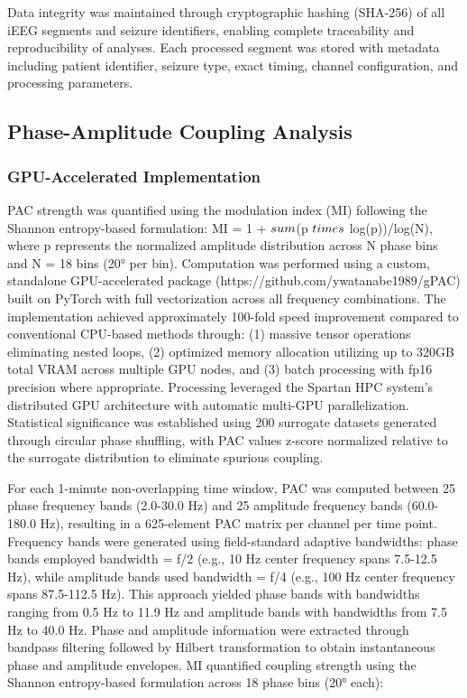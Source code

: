 	Data integrity was maintained through cryptographic hashing (SHA-256) of all iEEG segments and seizure identifiers, enabling complete traceability and reproducibility of analyses. Each processed segment was stored with metadata including patient identifier, seizure type, exact timing, channel configuration, and processing parameters.

\subsection{Phase-Amplitude Coupling Analysis}
\subsubsection{GPU-Accelerated Implementation}
PAC strength was quantified using the modulation index (MI) \cite{Tort} following the Shannon entropy-based formulation: MI = 1 + $\\sum$(p $\\times$ log(p))/log(N), where p represents the normalized amplitude distribution across N phase bins and N = 18 bins (20° per bin). Computation was performed using a custom, standalone GPU-accelerated package (https://github.com/ywatanabe1989/gPAC) built on PyTorch with full vectorization across all frequency combinations. The implementation achieved approximately 100-fold speed improvement compared to conventional CPU-based methods through: (1) massive tensor operations eliminating nested loops, (2) optimized memory allocation utilizing up to 320GB total VRAM across multiple GPU nodes, and (3) batch processing with fp16 precision where appropriate. Processing leveraged the Spartan HPC system's distributed GPU architecture  with automatic multi-GPU parallelization. Statistical significance was established using 200 surrogate datasets generated through circular phase shuffling, with PAC values z-score normalized relative to the surrogate distribution to eliminate spurious coupling.

	For each 1-minute non-overlapping time window, PAC was computed between 25 phase frequency bands (2.0-30.0 Hz) and 25 amplitude frequency bands (60.0-180.0 Hz), resulting in a 625-element PAC matrix per channel per time point. Frequency bands were generated using field-standard adaptive bandwidths: phase bands employed bandwidth = f/2 (e.g., 10 Hz center frequency spans 7.5-12.5 Hz), while amplitude bands used bandwidth = f/4 (e.g., 100 Hz center frequency spans 87.5-112.5 Hz). This approach yielded phase bands with bandwidths ranging from 0.5 Hz to 11.9 Hz and amplitude bands with bandwidths from 7.5 Hz to 40.0 Hz. Phase and amplitude information were extracted through bandpass filtering followed by Hilbert transformation to obtain instantaneous phase and amplitude envelopes. MI quantified coupling strength using the Shannon entropy-based formulation across 18 phase bins (20° each):

